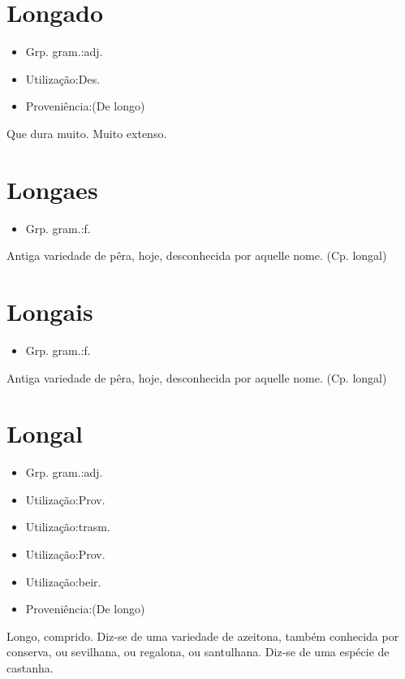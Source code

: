 \section{Longado}
\begin{itemize}
\item {Grp. gram.:adj.}
\end{itemize}
\begin{itemize}
\item {Utilização:Des.}
\end{itemize}
\begin{itemize}
\item {Proveniência:(De \textunderscore longo\textunderscore )}
\end{itemize}
Que dura muito.
Muito extenso.
\section{Longaes}
\begin{itemize}
\item {Grp. gram.:f.}
\end{itemize}
Antiga variedade de pêra, hoje, desconhecida por aquelle nome.
(Cp. \textunderscore longal\textunderscore )
\section{Longais}
\begin{itemize}
\item {Grp. gram.:f.}
\end{itemize}
Antiga variedade de pêra, hoje, desconhecida por aquelle nome.
(Cp. \textunderscore longal\textunderscore )
\section{Longal}
\begin{itemize}
\item {Grp. gram.:adj.}
\end{itemize}
\begin{itemize}
\item {Utilização:Prov.}
\end{itemize}
\begin{itemize}
\item {Utilização:trasm.}
\end{itemize}
\begin{itemize}
\item {Utilização:Prov.}
\end{itemize}
\begin{itemize}
\item {Utilização:beir.}
\end{itemize}
\begin{itemize}
\item {Proveniência:(De \textunderscore longo\textunderscore )}
\end{itemize}
Longo, comprido.
Diz-se de uma variedade de azeitona, também conhecida por \textunderscore conserva\textunderscore , ou \textunderscore sevilhana\textunderscore , ou \textunderscore regalona\textunderscore , ou \textunderscore santulhana\textunderscore .
Diz-se de uma espécie de castanha.

